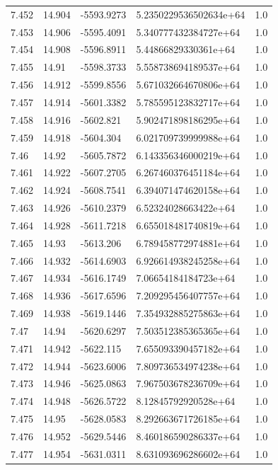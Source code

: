 \begin{tabular}{lllll}
7.452 & 14.904 & -5593.9273 & 5.2350229536502634e+64 & 1.0 \\
7.453 & 14.906 & -5595.4091 & 5.340777432384727e+64 & 1.0 \\
7.454 & 14.908 & -5596.8911 & 5.44866829330361e+64 & 1.0 \\
7.455 & 14.91 & -5598.3733 & 5.558738694189537e+64 & 1.0 \\
7.456 & 14.912 & -5599.8556 & 5.671032664670806e+64 & 1.0 \\
7.457 & 14.914 & -5601.3382 & 5.785595123832717e+64 & 1.0 \\
7.458 & 14.916 & -5602.821 & 5.902471898186295e+64 & 1.0 \\
7.459 & 14.918 & -5604.304 & 6.021709739999988e+64 & 1.0 \\
7.46 & 14.92 & -5605.7872 & 6.143356346000219e+64 & 1.0 \\
7.461 & 14.922 & -5607.2705 & 6.267460376451184e+64 & 1.0 \\
7.462 & 14.924 & -5608.7541 & 6.394071474620158e+64 & 1.0 \\
7.463 & 14.926 & -5610.2379 & 6.52324028663422e+64 & 1.0 \\
7.464 & 14.928 & -5611.7218 & 6.655018481740819e+64 & 1.0 \\
7.465 & 14.93 & -5613.206 & 6.789458772974881e+64 & 1.0 \\
7.466 & 14.932 & -5614.6903 & 6.926614938245258e+64 & 1.0 \\
7.467 & 14.934 & -5616.1749 & 7.06654184184723e+64 & 1.0 \\
7.468 & 14.936 & -5617.6596 & 7.209295456407757e+64 & 1.0 \\
7.469 & 14.938 & -5619.1446 & 7.354932885275863e+64 & 1.0 \\
7.47 & 14.94 & -5620.6297 & 7.503512385365365e+64 & 1.0 \\
7.471 & 14.942 & -5622.115 & 7.655093390457182e+64 & 1.0 \\
7.472 & 14.944 & -5623.6006 & 7.809736534974238e+64 & 1.0 \\
7.473 & 14.946 & -5625.0863 & 7.967503678236709e+64 & 1.0 \\
7.474 & 14.948 & -5626.5722 & 8.12845792920528e+64 & 1.0 \\
7.475 & 14.95 & -5628.0583 & 8.292663671726185e+64 & 1.0 \\
7.476 & 14.952 & -5629.5446 & 8.460186590286337e+64 & 1.0 \\
7.477 & 14.954 & -5631.0311 & 8.631093696286602e+64 & 1.0 \\

\end{tabular}
